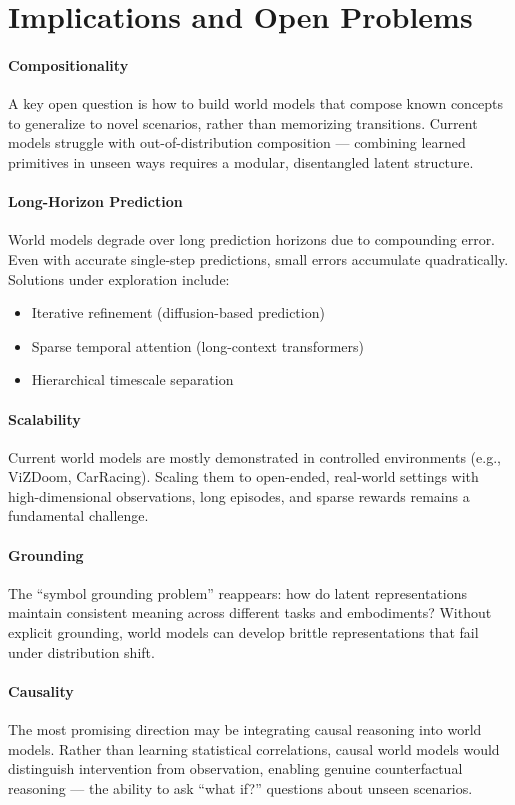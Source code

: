 \documentclass{tufte-handout}
\begin{document}
\section{Implications and Open Problems}

\paragraph{Compositionality}
A key open question is how to build world models that compose known concepts to generalize to
novel scenarios, rather than memorizing transitions. Current models struggle with
out-of-distribution composition --- combining learned primitives in unseen ways requires a
modular, disentangled latent structure.

\paragraph{Long-Horizon Prediction}
World models degrade over long prediction horizons due to compounding error. Even with accurate
single-step predictions, small errors accumulate quadratically. Solutions under exploration
include:
\begin{itemize}
    \item Iterative refinement (diffusion-based prediction)
    \item Sparse temporal attention (long-context transformers)
    \item Hierarchical timescale separation
\end{itemize}

\paragraph{Scalability}
Current world models are mostly demonstrated in controlled environments (e.g., ViZDoom,
CarRacing). Scaling them to open-ended, real-world settings with high-dimensional observations,
long episodes, and sparse rewards remains a fundamental challenge.

\paragraph{Grounding}
The ``symbol grounding problem'' reappears: how do latent representations maintain consistent
meaning across different tasks and embodiments? Without explicit grounding, world models can
develop brittle representations that fail under distribution shift.

\paragraph{Causality}
The most promising direction may be integrating causal reasoning into world models. Rather than
learning statistical correlations, causal world models would distinguish intervention from
observation, enabling genuine counterfactual reasoning --- the ability to ask ``what if?''
questions about unseen scenarios.
\end{document}
